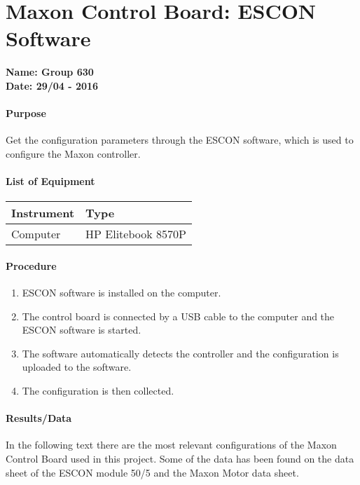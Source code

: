 \chapter{Maxon Control Board: ESCON Software}\label{MaxonControlESCON} 
\textbf{Name: Group 630}\\
\textbf{Date: 29/04 - 2016}

\subsubsection{Purpose}
Get the configuration parameters through the ESCON software, which is used to configure the Maxon controller.  

\subsubsection{List of Equipment}
\begin{table}[H]
	\centering
	\begin{tabular}{|p{10cm}|p{4cm}|}
		\hline%
		\textbf{Instrument}                &  \textbf{Type} \\
		\hline%
		Computer                           &  HP Elitebook 8570P  \\
		\hline%
	\end{tabular}
\end{table}

\subsubsection{Procedure}
\begin{enumerate}
  \item ESCON software is installed on the computer.
  \item The control board is connected by a USB cable to the computer and the ESCON software is started.
  \item The software automatically detects the controller and the configuration is uploaded to the software.
  \item The configuration is then collected.
\end{enumerate}

\subsubsection{Results/Data}
In the following text there are the most relevant configurations of the Maxon Control Board used in this project. Some of the data has been found on the data sheet of the ESCON module 50/5 and the Maxon Motor data sheet.

